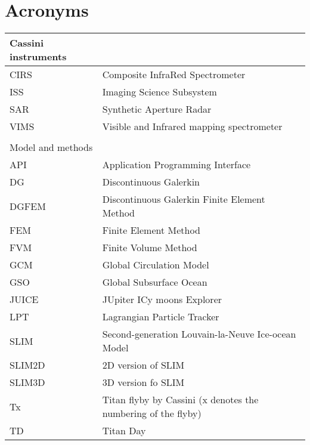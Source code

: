 
\chapter*{Acronyms}

\begin{tabular}{lp{7.5cm}}
Cassini instruments&\\
\hline
CIRS & Composite InfraRed Spectrometer\\
ISS & Imaging Science Subsystem\\
SAR & Synthetic Aperture Radar \\
VIMS & Visible and Infrared mapping spectrometer\\
&\\
Model and methods&\\
\hline
API & Application Programming Interface\\
DG & Discontinuous Galerkin\\
DGFEM & Discontinuous Galerkin Finite Element Method\\
FEM & Finite Element Method\\
FVM & Finite Volume Method\\
GCM & Global Circulation Model\\
GSO & Global Subsurface Ocean\\
JUICE & JUpiter ICy moons Explorer\\
LPT & Lagrangian Particle Tracker\\
SLIM & Second-generation Louvain-la-Neuve Ice-ocean Model\\
SLIM2D & 2D version of SLIM\\
SLIM3D & 3D version fo SLIM\\
Tx & Titan flyby by Cassini (x denotes the numbering of the flyby)\\
TD & Titan Day\\
\end{tabular}